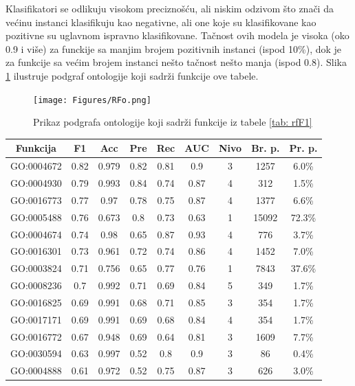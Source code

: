 Klasifikatori se odlikuju visokom preciznošću, ali niskim odzivom što znači da većinu instanci klasifikuju kao negativne, ali one koje su klasifikovane kao pozitivne su uglavnom ispravno klasifikovane. Tačnost ovih modela je visoka (oko 0.9 i više) za funckije sa manjim brojem pozitivnih instanci (ispod 10\%), dok je za funkcije sa većim brojem instanci nešto tačnost nešto manja (ispod 0.8). Slika \ref{fig:rf_ontology} ilustruje podgraf ontologije koji sadrži funkcije ove tabele.


\begin{figure}[H]
	\centering
	\texttt{[image: Figures/RFo.png]}
	\caption{Prikaz podgrafa ontologije koji sadrži funkcije iz tabele \ref{tab: rfF1}}
	\label{fig:rf_ontology}
\end{figure}

\begin{table}[h]
	\centering
	\begin{tabular}{|c|c|c|c|c|c|c|c|c|}
		\hline
		Funkcija & F1 & Acc & Pre & Rec & AUC & Nivo & Br. p. & Pr. p. \\
		\hline
		GO:0004672 & 0.82 & 0.979 & 0.82 & 0.81 & 0.9 & 3 & 1257 & 6.0\% \\
		\hline
		GO:0004930 & 0.79 & 0.993 & 0.84 & 0.74 & 0.87 & 4 & 312 & 1.5\% \\
		\hline
		GO:0016773 & 0.77 & 0.97 & 0.78 & 0.75 & 0.87 & 4 & 1377 & 6.6\% \\
		\hline
		GO:0005488 & 0.76 & 0.673 & 0.8 & 0.73 & 0.63 & 1 & 15092 & 72.3\% \\
		\hline
		GO:0004674 & 0.74 & 0.98 & 0.65 & 0.87 & 0.93 & 4 & 776 & 3.7\% \\
		\hline
		GO:0016301 & 0.73 & 0.961 & 0.72 & 0.74 & 0.86 & 4 & 1452 & 7.0\% \\
		\hline
		GO:0003824 & 0.71 & 0.756 & 0.65 & 0.77 & 0.76 & 1 & 7843 & 37.6\% \\
		\hline
		GO:0008236 & 0.7 & 0.992 & 0.71 & 0.69 & 0.84 & 5 & 349 & 1.7\% \\
		\hline
		GO:0016825 & 0.69 & 0.991 & 0.68 & 0.71 & 0.85 & 3 & 354 & 1.7\% \\
		\hline
		GO:0017171 & 0.69 & 0.991 & 0.69 & 0.68 & 0.84 & 4 & 354 & 1.7\% \\
		\hline
		GO:0016772 & 0.67 & 0.948 & 0.69 & 0.64 & 0.81 & 3 & 1609 & 7.7\% \\
		\hline
		GO:0030594 & 0.63 & 0.997 & 0.52 & 0.8 & 0.9 & 3 & 86 & 0.4\% \\
		\hline
		GO:0004888 & 0.61 & 0.972 & 0.52 & 0.75 & 0.87 & 3 & 626 & 3.0\% \\

\end{tabular}
\end{table}
